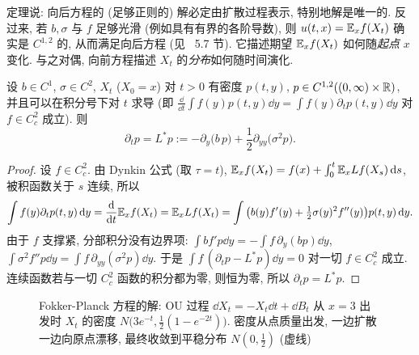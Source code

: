 定理说: 向后方程的 (足够正则的) 解必定由扩散过程表示, 特别地解是唯一的. 反过来, 若 $b,\sigma$ 与 $f$ 足够光滑 (例如具有有界的各阶导数), 则 $u(t,x)=\mathbb{E}_xf(X_t)$ 确实是 $C^{1,2}$ 的, 从而满足向后方程 (见~\cite{karatzas} 5.7 节). 它描述期望 $\mathbb{E}_xf(X_t)$ 如何随\emph{起点} $x$ 变化. 与之对偶, 向前方程描述 $X_t$ 的\emph{分布}如何随时间演化.

\begin{theorem}\label{thm:forward}
设 $b\in C^1$, $\sigma\in C^2$, $X_t$ ($X_0=x$) 对 $t>0$ 有密度 $p(t,y)$, $p\in C^{1,2}((0,\infty)\times\mathbb{R})$, 并且可以在积分号下对 $t$ 求导 (即 $\frac{\dd}{\dd t}\int f(y)p(t,y)\dd y=\int f(y)\partial_tp(t,y)\dd y$ 对 $f\in C^2_c$ 成立). 则
\[
\partial_tp=L^*p:=-\partial_y\big(b\,p\big)+\frac{1}{2}\partial_{yy}\big(\sigma^2p\big).
\]
\end{theorem}

\begin{proof}
设 $f\in C^2_c$. 由 Dynkin 公式 (取 $\tau=t$), $\mathbb{E}_xf(X_t)=f(x)+\int_0^t\mathbb{E}_xLf(X_s)\mathop{}\!\mathrm{d} s$, 被积函数关于 $s$ 连续, 所以
\[
\int f(y)\partial_tp(t,y)\mathop{}\!\mathrm{d} y=\frac{\mathop{}\!\mathrm{d}}{\mathop{}\!\mathrm{d} t}\mathbb{E}_xf(X_t)=\mathbb{E}_xLf(X_t)=\int\big(b(y)f'(y)+\tfrac{1}{2}\sigma(y)^2f''(y)\big)p(t,y)\mathop{}\!\mathrm{d} y.
\]
由于 $f$ 支撑紧, 分部积分没有边界项: $\int bf'p\dd y=-\int f\,\partial_y(bp)\dd y$, $\int\sigma^2f''p\dd y=\int f\,\partial_{yy}(\sigma^2p)\dd y$. 于是 $\int f\,(\partial_tp-L^*p)\dd y=0$ 对一切 $f\in C^2_c$ 成立. 连续函数若与一切 $C^2_c$ 函数的积分都为零, 则恒为零, 所以 $\partial_tp=L^*p$.
\end{proof}

\begin{figure}[htbp]
\centering
{}
\caption{Fokker-Planck 方程的解: OU 过程 $\dd X_t=-X_t\dd t+\dd B_t$ 从 $x=3$ 出发时 $X_t$ 的密度 $N\big(3e^{-t},\frac12(1-e^{-2t})\big)$. 密度从点质量出发, 一边扩散一边向原点漂移, 最终收敛到平稳分布 $N(0,\frac12)$ (虚线)}
\label{fig:fokker-planck}
\end{figure}


